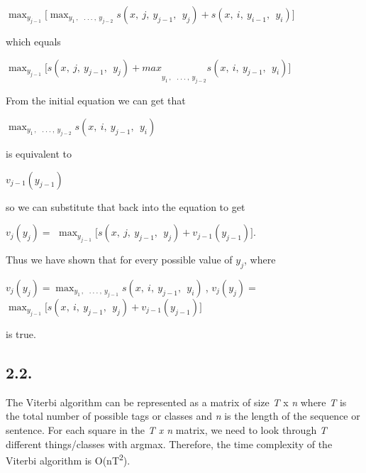 \documentclass[10pt]{article}
\begin{document}
\begin{center}
\(\max_{y_{j - 1}}\lbrack\max_{y_{1\ },\ \ \ .\ .\ .\ ,\ y_{j - 2}}s(x,\ j,\ y_{j - 1},\ \ y_{j}) + s(x,\ i,\ y_{i - 1},\ \ y_{i})\rbrack\ \)
\end{center}

\noindent which equals

\begin{center}
\(\max_{y_{j - 1}}\lbrack{s(x,\ j,\ y_{j - 1},\ \ y_{j}) + max}_{y_{1\ },\ \ \ .\ .\ .\ ,\ y_{j - 2}}s(x,\ i,\ y_{j - 1},\ \ y_{i})\rbrack\)
\end{center}

\noindent From the initial equation we can get that

\begin{center}
\(\max_{y_{1\ },\ \ \ .\ .\ .\ ,\ y_{j - 2}}s(x,\ i,\ y_{j - 1},\ \ y_{i})\)
\end{center}

\noindent is equivalent to 

\begin{center}
\(v_{j - 1}(y_{j - 1})\)
\end{center}

\noindent so we can substitute that back into the equation to get

\begin{center}
\(v_{j}(y_{j}) =\)
\(\max_{y_{j - 1}}\lbrack s(x,\ j,\ y_{j - 1},\ \ y_{j}) + v_{j - 1}(y_{j - 1})\rbrack\).
\end{center}


\noindent Thus we have shown that for every possible value of \(y_{j}\), where

\begin{center}
\(v_{j}(y_{j}) =\)\(\max_{y_{1\ },\ \ \ .\ .\ .\ ,\ y_{j - 1}}s(x,\ i,\ y_{j - 1},\ \ y_{i})\ \),
\(v_{j}(y_{j}) =\)
\(\max_{y_{j - 1}}\lbrack s(x,\ i,\ y_{j - 1},\ \ y_{j}) + v_{j - 1}(y_{j - 1})\rbrack\)
\end{center}

\noindent is true.

\subsection*{2.2.}
 The Viterbi algorithm can be represented as a matrix of size
\emph{T} x \emph{n} where \emph{T} is the total number of possible tags
or classes and \emph{n} is the length of the sequence or sentence. For
each square in the \emph{T x n} matrix, we need to look through \emph{T}
different things/classes with argmax. Therefore, the time complexity of
the Viterbi algorithm is O(n\textbar T\textbar{}\textsuperscript{2}). 
\end{document}
